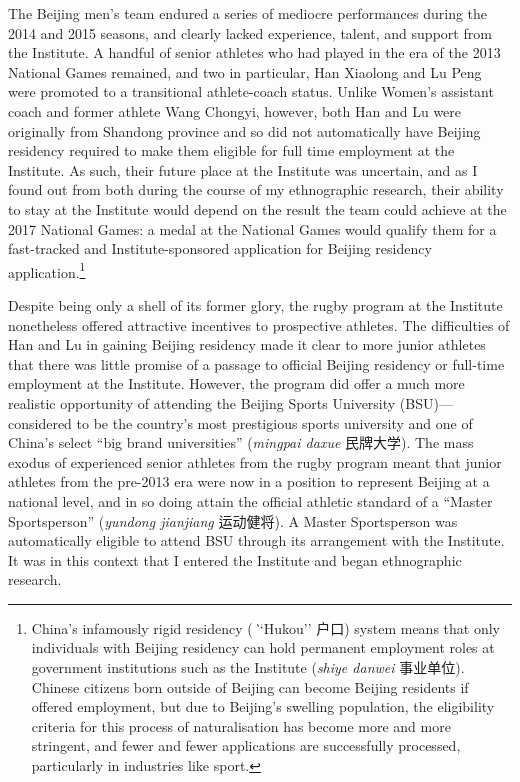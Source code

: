 \begin{CJK}{UTF8}{gbsn}
 The Beijing men's team endured a series of mediocre performances during the 2014 and 2015 seasons, and clearly lacked experience, talent, and support from the Institute.  A handful of senior athletes who had played in the era of the 2013 National Games remained, and two in particular, Han Xiaolong and Lu Peng were promoted to a transitional athlete-coach status. Unlike Women's assistant coach and former athlete Wang Chongyi, however, both Han and Lu were originally from Shandong province and so did not automatically have Beijing residency required to make them eligible for full time employment at the Institute.  As such, their future place at the Institute was uncertain, and as I found out from both during the course of my ethnographic research, their ability to stay at the Institute would depend on the result the team could achieve at the 2017 National Games: a medal at the National Games would qualify them for a fast-tracked and Institute-sponsored application for Beijing residency application.\footnote{China's infamously rigid residency (\textit``Hukou'' 户口) system means that only individuals with Beijing residency can hold permanent employment roles at government institutions such as the Institute (\textit{shiye danwei} 事业单位).  Chinese citizens born outside of Beijing can become Beijing residents if offered employment, but due to Beijing's swelling population, the eligibility criteria for this process of naturalisation has become more and more stringent, and fewer and fewer applications are successfully processed, particularly in industries like sport.}

 Despite being only a shell of its former glory, the rugby program at the Institute nonetheless offered attractive incentives to prospective athletes.  The difficulties of Han and Lu in gaining Beijing residency made it clear to more junior athletes that there was little promise of a passage to official Beijing residency or full-time employment at the Institute.  However, the program did offer a much more realistic opportunity of attending the Beijing Sports University (BSU)---considered to be the country's most prestigious sports university and one of China's select ``big brand universities'' (\textit{mingpai daxue} 民牌大学).  The mass exodus of experienced senior athletes from the rugby program meant that junior athletes from the pre-2013 era were now in a position to represent Beijing at a national level, and in so doing attain the official athletic standard of a ``Master Sportsperson'' (\textit{yundong jianjiang} 运动健将).  A Master Sportsperson was automatically eligible to attend BSU through its arrangement with the Institute.  It was in this context that I entered the Institute and began ethnographic research.


\end{CJK}
